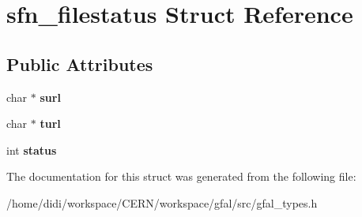 \section{sfn\_\-filestatus Struct Reference}
\label{structsfn__filestatus}
\subsection*{Public Attributes}
\begin{DoxyCompactItemize}
\item 
char $\ast$ {\bfseries surl}\label{structsfn__filestatus_aee0852efbe19bdbc030a40d3ec81faef}

\item 
char $\ast$ {\bfseries turl}\label{structsfn__filestatus_a3e985f92c5c06c19fd1b3ce37843122c}

\item 
int {\bfseries status}\label{structsfn__filestatus_a374237339199651b1e36307cf4703ea6}

\end{DoxyCompactItemize}


The documentation for this struct was generated from the following file:\begin{DoxyCompactItemize}
\item 
/home/didi/workspace/CERN/workspace/gfal/src/gfal\_\-types.h\end{DoxyCompactItemize}
